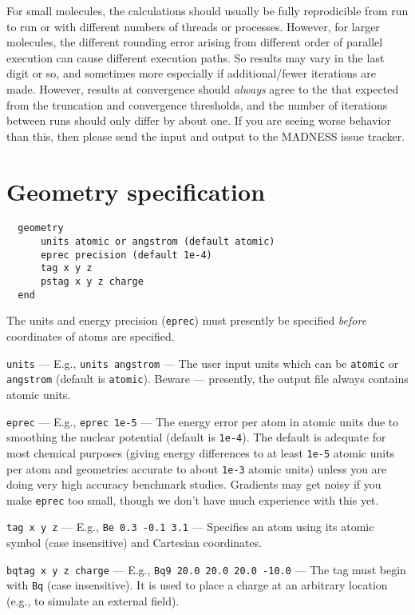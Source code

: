 \documentclass[letterpaper]{book}
\begin{document}
For small molecules, the calculations should usually be fully
reprodicible from run to run or with different numbers of threads or
processes.  However, for larger molecules, the different rounding
error arising from different order of parallel execution can cause
different execution paths.  So results may vary in the last digit or
so, and sometimes more especially if additional/fewer iterations are
made.  However, results at convergence should {\em always} agree to
the that expected from the truncation and convergence thresholds, and
the number of iterations between runs should only differ by about one.
If you are seeing worse behavior than this, then please send the input
and output to the MADNESS issue tracker.

\chapter{Geometry specification}

\begin{verbatim}
  geometry
      units atomic or angstrom (default atomic)
      eprec precision (default 1e-4)
      tag x y z
      pstag x y z charge
  end
\end{verbatim}

The units and energy precision ({\tt eprec}) must presently be specified {\em before} coordinates of atoms are specified.

{\tt units} --- E.g., {\tt units angstrom} --- The user input units which can be {\tt atomic} or {\tt angstrom} (default is {\tt atomic}).  Beware --- presently, the output file always contains atomic units.

{\tt eprec} --- E.g., {\tt eprec 1e-5} --- The energy error per atom
in atomic units due to smoothing the nuclear potential (default is
{\tt 1e-4}).  The default is adequate for most chemical purposes
(giving energy differences to at least {\tt 1e-5} atomic units per atom
and geometries accurate to about {\tt 1e-3} atomic units) unless you
are doing very high accuracy benchmark studies.  Gradients may get
noisy if you make {\tt eprec} too small, though we don't have much
experience with this yet. 

{\tt tag x y z} --- E.g., {\tt Be 0.3 -0.1 3.1} --- Specifies an atom using its atomic symbol (case insensitive) and Cartesian coordinates.

{\tt bqtag x y z charge} --- E.g., {\tt Bq9 20.0 20.0 20.0 -10.0} --- The tag must begin with {\tt Bq} (case insensitive).  It is used to place a charge at an arbitrary location (e.g., to simulate an external field).
\end{document}
